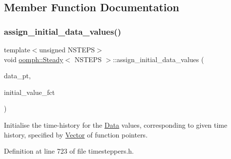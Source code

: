 \subsection{Member Function Documentation}
\mbox{\label{classoomph_1_1Steady_a9598718f5a8ab37a123fb183ba4b8bf9}} 
\subsubsection{\texorpdfstring{assign\+\_\+initial\+\_\+data\+\_\+values()}{assign\_initial\_data\_values()}}
{\footnotesize\ttfamily template$<$unsigned N\+S\+T\+E\+PS$>$ \\
void \hyperlink{classoomph_1_1Steady}{oomph\+::\+Steady}$<$ N\+S\+T\+E\+PS $>$\+::assign\+\_\+initial\+\_\+data\+\_\+values (\begin{DoxyParamCaption}\item[{\hyperlink{classoomph_1_1Data}{Data} $\ast$const \&}]{data\+\_\+pt,  }\item[{\hyperlink{classoomph_1_1Vector}{Vector}$<$ \hyperlink{classoomph_1_1Steady_a107849d71562b3efa4bf785de60490b3}{Initial\+Condition\+Fct\+Pt} $>$}]{initial\+\_\+value\+\_\+fct }\end{DoxyParamCaption})\hspace{0.3cm}{\ttfamily [inline]}}



Initialise the time-\/history for the \hyperlink{classoomph_1_1Data}{Data} values, corresponding to given time history, specified by \hyperlink{classoomph_1_1Vector}{Vector} of function pointers. 



Definition at line 723 of file timesteppers.\+h.

\mbox{\label{classoomph_1_1Steady_ad0aa4ed8297b77af2295827b1c0052b0}} 
